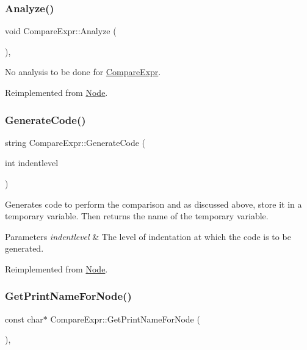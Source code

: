\subsubsection{\texorpdfstring{Analyze()}{Analyze()}}
{\footnotesize\ttfamily void Compare\+Expr\+::\+Analyze (\begin{DoxyParamCaption}{ }\end{DoxyParamCaption})\hspace{0.3cm}{\ttfamily [inline]}, {\ttfamily [virtual]}}

No analysis to be done for \hyperlink{class_compare_expr}{Compare\+Expr}. 

Reimplemented from \hyperlink{class_node_a5f88d55c6f253a29def7ccc443d83d47}{Node}.

\mbox{\label{class_compare_expr_a5e5388b4d036996fc32913efd3ab3123}} 
\subsubsection{\texorpdfstring{Generate\+Code()}{GenerateCode()}}
{\footnotesize\ttfamily string Compare\+Expr\+::\+Generate\+Code (\begin{DoxyParamCaption}\item[{int}]{indentlevel }\end{DoxyParamCaption})\hspace{0.3cm}{\ttfamily [virtual]}}

Generates code to perform the comparison and as discussed above, store it in a temporary variable. Then returns the name of the temporary variable. 
\begin{DoxyParams}{Parameters}
{\em indentlevel} & The level of indentation at which the code is to be generated. \\
\hline
\end{DoxyParams}


Reimplemented from \hyperlink{class_node_acb60e526730e8436056375a3055c2c32}{Node}.

\mbox{\label{class_compare_expr_a28dc1cb43c2251d78c7ac8f443760f2f}} 
\subsubsection{\texorpdfstring{Get\+Print\+Name\+For\+Node()}{GetPrintNameForNode()}}
{\footnotesize\ttfamily const char$\ast$ Compare\+Expr\+::\+Get\+Print\+Name\+For\+Node (\begin{DoxyParamCaption}{ }\end{DoxyParamCaption})\hspace{0.3cm}{\ttfamily [inline]}, {\ttfamily [virtual]}}

